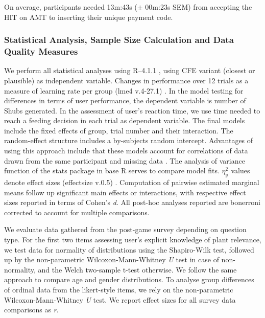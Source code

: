 On average, participants needed 13m:43s ($\pm$ 00m:23s SEM) from accepting the HIT on AMT to inserting their unique payment code.

\subsubsection{Statistical Analysis, Sample Size Calculation and Data Quality Measures}

We perform all statistical analyses using R–4.1.1 \citep{r_core_team_r_2021}, using \gls{CFE} variant (closest or plausible) as independent variable.
Changes in performance over 12 trials as a measure of learning rate per group (lme4 v.4-27.1) \citep{bates_fitting_2015}.
In the model testing for differences in terms of user performance, the dependent variable is number of Shubs generated. 
In the assessment of user's reaction time, we use time needed to reach a feeding decision in each trial as dependent variable.
The final models include the fixed effects of group, trial number and their interaction. The random-effect structure includes a by-subjects random intercept. 
Advantages of using this approach include that these models account for correlations of data drawn from the same participant and missing data \citep{detry_analyzing_2016,muth_alternative_2016}.
The analysis of variance function of the stats package in base R serves to compare model fits.
$\eta_{\text{p}}^{2}$ values denote effect sizes (effectsize v.0.5) \citep{ben-shachar_effectsize_2020}.
Computation of pairwise estimated marginal means follow up significant main effects or interactions, with respective effect sizes reported in terms of Cohen’s \textit{d}.
All post-hoc analyses reported are bonerroni corrected to account for multiple comparisons.

We evaluate data gathered from the post-game survey depending on question type.
For the first two items assessing user's explicit knowledge of plant relevance, we test data for normality of distributions using the Shapiro-Wilk test, followed up by the non-parametric Wilcoxon-Mann-Whitney \textit{U} test in case of non-normality, and the Welch two-sample t-test otherwise. 
We follow the same approach to compare age and gender distributions.
To analyse group differences of ordinal data from the likert-style items, we rely on the non-parametric Wilcoxon-Mann-Whitney \textit{U} test.
We report effect sizes for all survey data comparisons as \textit{r}.


